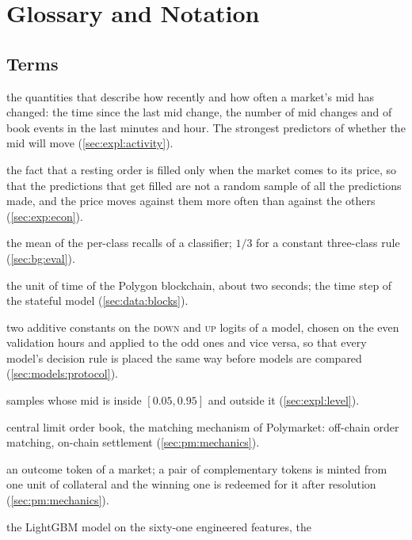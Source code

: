 \chapter{Glossary and Notation}
\label{ch:glossary}

\section*{Terms}
\begin{description}[nosep, font=\normalfont\itshape, leftmargin=3.2cm, style=nextline]
  \item[activity clock] the quantities that describe how recently and how often a market's
  mid has changed: the time since the last mid change, the number of mid changes and of
  book events in the last minutes and hour.  The strongest predictors of whether the mid
  will move (\cref{sec:expl:activity}).
  \item[adverse selection] the fact that a resting order is filled only when the market
  comes to its price, so that the predictions that get filled are not a random sample of
  all the predictions made, and the price moves against them more often than against the
  others (\cref{sec:exp:econ}).
  \item[balanced accuracy] the mean of the per-class recalls of a classifier; $1/3$ for a
  constant three-class rule (\cref{sec:bg:eval}).
  \item[block] the unit of time of the Polygon blockchain, about two seconds; the time step
  of the stateful model (\cref{sec:data:blocks}).
  \item[calibration (offsets)] two additive constants on the \textsc{down} and \textsc{up}
  logits of a model, chosen on the even validation hours and applied to the odd ones and
  vice versa, so that every model's decision rule is placed the same way before models are
  compared (\cref{sec:models:protocol}).
  \item[central / extreme samples] samples whose mid is inside $[0.05, 0.95]$ and outside
  it (\cref{sec:expl:level}).
  \item[CLOB] central limit order book, the matching mechanism of Polymarket: off-chain
  order matching, on-chain settlement (\cref{sec:pm:mechanics}).
  \item[conditional token] an outcome token of a market; a pair of complementary tokens is
  minted from one unit of collateral and the winning one is redeemed for it after resolution
  (\cref{sec:pm:mechanics}).
  \item[control (no-state)] the LightGBM model on the sixty-one engineered features, the

\end{description}
